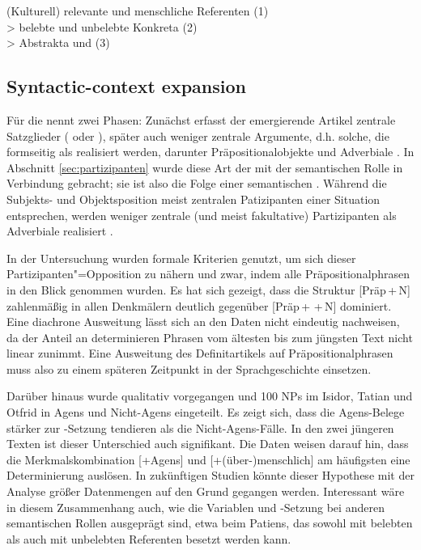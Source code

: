 \begin{exe}
	\ex \label{ex:belebtheitsskala} (Kulturell) relevante  und menschliche Referenten (1)\\>  belebte  und unbelebte  Konkreta (2)\\> Abstrakta  und  (3)
	\end{exe}


\subsection{Syntactic-context expansion} \label{sec:syn-expansion}

Für die   nennt \textcite{Himmelmann2004} zwei Phasen: Zunächst erfasst der emergierende Artikel zentrale Satzglieder ( oder ), später auch weniger zentrale Argumente, d.h. solche, die formseitig als  realisiert werden, darunter Präpositionalobjekte  und Adverbiale  \parencite{Himmelmann1998}. In Abschnitt \ref{sec:partizipanten} wurde diese Art der  mit der semantischen Rolle  in Verbindung gebracht; sie ist also  die Folge einer semantischen . Während die  Subjekts- und Objektsposition  meist zentralen Patizipanten einer Situation entsprechen, werden weniger zentrale (und meist fakultative) Partizipanten als Adverbiale  realisiert \parencite{Lehmann2004a}. 

In der Untersuchung wurden formale Kriterien genutzt, um sich dieser Partizipanten"=Opposition zu nähern und zwar, indem alle Präpositionalphrasen  in den Blick genommen wurden. Es hat sich gezeigt, dass die Struktur [Präp\,+\,N] zahlenmäßig in allen Denkmälern deutlich gegenüber [Präp\,+\,\,+\,N] dominiert. Eine diachrone Ausweitung lässt sich an den Daten nicht eindeutig nachweisen, da der Anteil an determinieren Phrasen vom ältesten bis zum jüngsten Text nicht linear zunimmt. Eine Ausweitung des Definitartikels  auf Präpositionalphrasen  muss also zu einem späteren Zeitpunkt in der Sprachgeschichte einsetzen. 

Darüber hinaus wurde qualitativ vorgegangen und 100 NPs im Isidor, Tatian und Otfrid in Agens und Nicht-Agens  eingeteilt. Es zeigt sich, dass die Agens-Belege  stärker zur -Setzung tendieren als die Nicht-Agens-Fälle. In den zwei jüngeren Texten ist dieser Unterschied auch signifikant. Die Daten weisen darauf hin, dass die Merkmalskombination [+Agens]  und [+(über-)menschlich] am häufigsten eine Determinierung auslösen. In zukünftigen Studien könnte dieser Hypothese mit der Analyse größer Datenmengen auf den Grund gegangen werden. Interessant wäre in diesem Zusammenhang auch, wie die Variablen  und -Setzung bei anderen semantischen Rollen  ausgeprägt sind, etwa beim Patiens, das sowohl mit belebten als auch mit unbelebten Referenten besetzt werden kann.   

